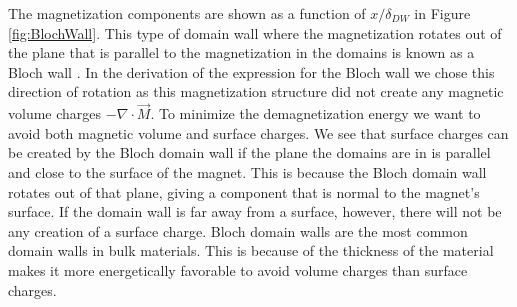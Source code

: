 \documentclass[12pt, a4paper, twoside, openright]{article}		%
\numberwithin{equation}{section}
\begin{document}
The magnetization components are shown as a function of $x/\delta_{DW}$ in Figure \ref{fig:BlochWall}. This type of domain wall where the magnetization rotates out of the plane that is parallel to the magnetization in the domains is known as a Bloch wall \cite{Bloch1932}. In the derivation of the expression for the Bloch wall we chose this direction of rotation as this magnetization structure did not create any magnetic volume charges $-\nabla\cdot\vec{M}$. To minimize the demagnetization energy we want to avoid both magnetic volume and surface charges. We see that surface charges can be created by the Bloch domain wall if the plane the domains are in is parallel and close to the surface of the magnet. This is because the Bloch domain wall rotates out of that plane, giving a component that is normal to the magnet's surface. If the domain wall is far away from a surface, however, there will not be any creation of a surface charge. Bloch domain walls are the most common domain walls in bulk materials. This is because of the thickness of the material makes it more energetically favorable to avoid volume charges than surface charges.
\end{document}
